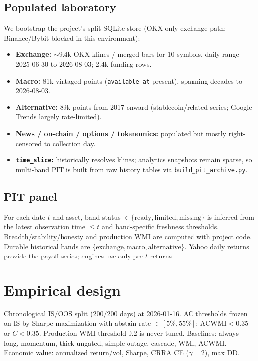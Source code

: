 \documentclass[12pt]{article}
\begin{document}
\subsection{Populated laboratory}
We bootstrap the project's split SQLite store (OKX-only exchange path; Binance/Bybit blocked in this environment):
\begin{itemize}
\item \textbf{Exchange:} $\sim$9.4k OKX klines / merged bars for 10 symbols, daily range 2025-06-30 to 2026-08-03; 2.4k funding rows.
\item \textbf{Macro:} 81k vintaged points (\texttt{available\_at} present), spanning decades to 2026-08-03.
\item \textbf{Alternative:} 89k points from 2017 onward (stablecoin/related series; Google Trends largely rate-limited).
\item \textbf{News / on-chain / options / tokenomics:} populated but mostly right-censored to collection day.
\item \textbf{\texttt{time\_slice}:} historically resolves klines; analytics snapshots remain sparse, so multi-band PIT is built from raw history tables via \texttt{build\_pit\_archive.py}.
\end{itemize}

\subsection{PIT panel}
For each date $t$ and asset, band status $\in\{\mathrm{ready},\mathrm{limited},\mathrm{missing}\}$ is inferred from the latest observation time $\le t$ and band-specific freshness thresholds. Breadth/stability/honesty and production WMI are computed with project code. Durable historical bands are $\{\mathrm{exchange},\mathrm{macro},\mathrm{alternative}\}$. Yahoo daily returns provide the payoff series; engines use only pre-$t$ returns.

\section{Empirical design}

Chronological IS/OOS split (200/200 days) at 2026-01-16. AC thresholds frozen on IS by Sharpe maximization with abstain rate $\in[5\%,55\%]$: $\mathrm{ACWMI}<0.35$ or $C<0.35$. Production WMI threshold $0.2$ is never tuned. Baselines: always-long, momentum, thick-ungated, simple outage, cascade, WMI, ACWMI. Economic value: annualized return/vol, Sharpe, CRRA CE ($\gamma=2$), max DD.
\end{document}
